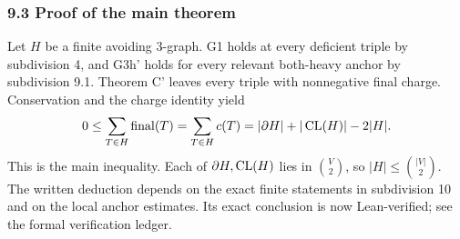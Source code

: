 \subsubsection*{9.3 Proof of the main theorem}
Let $H$ be a finite avoiding $3$-graph. G1 holds at every deficient triple by subdivision 4, and G3h' holds for every relevant both-heavy anchor by subdivision 9.1. Theorem C' leaves every triple with nonnegative final charge. Conservation and the charge identity yield
\[
 0\leq\sum_{T\in H}\operatorname{final}(T)
 =\sum_{T\in H}c(T)=|\partial H|+|\operatorname{CL}(H)|-2|H|.
\]
This is the main inequality. Each of $\partial H,\operatorname{CL}(H)$ lies in $\binom V2$, so $|H|\leq\binom{|V|}{2}$. The written deduction depends on the exact finite statements in subdivision 10 and on the local anchor estimates. Its exact conclusion is now Lean-verified; see the formal verification ledger.
